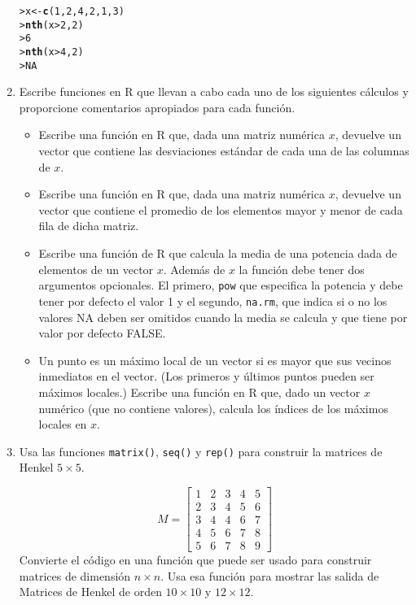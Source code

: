 \documentclass{article}\usepackage[]{graphicx}\usepackage[]{color}
\makeatletter
\newcommand{\hlnum}[1]{\textcolor[rgb]{0.686,0.059,0.569}{#1}}%
\newcommand{\hlopt}[1]{\textcolor[rgb]{0,0,0}{#1}}%
\newcommand{\hlstd}[1]{\textcolor[rgb]{0.345,0.345,0.345}{#1}}%
\newcommand{\hlkwb}[1]{\textcolor[rgb]{0.69,0.353,0.396}{#1}}%
\newcommand{\hlkwd}[1]{\textcolor[rgb]{0.737,0.353,0.396}{\textbf{#1}}}%
\newenvironment{kframe}{%
 \def\at@end@of@kframe{}%
 \ifinner\ifhmode%
  \def\at@end@of@kframe{\end{minipage}}%
  \begin{minipage}{\columnwidth}%
 \fi\fi%
 \def\FrameCommand##1{\hskip\@totalleftmargin \hskip-\fboxsep
 \colorbox{shadecolor}{##1}\hskip-\fboxsep
     \hskip-\linewidth \hskip-\@totalleftmargin \hskip\columnwidth}%
 \MakeFramed {\advance\hsize-\width
   \@totalleftmargin\z@ \linewidth\hsize
   \@setminipage}}%
 {\par\unskip\endMakeFramed%
 \at@end@of@kframe}
\newenvironment{knitrout}{}{} %
\makeatother
\begin{document}
\begin{enumerate}
\begin{knitrout}
\color{fgcolor}\begin{kframe}
\begin{alltt}
\hlstd{> }\hlstd{x}\hlkwb{<-}\hlkwd{c}\hlstd{(}\hlnum{1}\hlstd{,}\hlnum{2}\hlstd{,}\hlnum{4}\hlstd{,}\hlnum{2}\hlstd{,}\hlnum{1}\hlstd{,}\hlnum{3}\hlstd{)}
\hlstd{> }\hlkwd{nth}\hlstd{(x} \hlopt{>}\hlnum{2}\hlstd{,} \hlnum{2}\hlstd{)}
\hlstd{> }\hlnum{6}
\hlstd{> }\hlkwd{nth}\hlstd{(x} \hlopt{>} \hlnum{4}\hlstd{,}\hlnum{2}\hlstd{)}
\hlstd{> }\hlnum{NA}
\end{alltt}
\end{kframe}
\end{knitrout}
\item Escribe funciones en R que llevan a cabo cada uno de los siguientes c\'alculos y proporcione \mbox{comentarios} apropiados para cada funci\'on.
\begin{itemize}
\item Escribe una funci\'on en R que, dada una matriz num\'erica $x$, devuelve un vector que contiene las desviaciones est\'andar de cada una de las columnas de $x$.
\item Escribe una función en R que, dada una matriz num\'erica $x$, devuelve un vector que contiene el promedio de los elementos  mayor y menor de cada fila de dicha matriz.
\item Escribe una funci\'on de R que calcula la media de una potencia dada de  elementos de un vector $x$. Adem\'as de $x$ la funci\'on  debe tener dos argumentos opcionales. El primero, \texttt{pow} que especifica la potencia y debe tener por defecto el valor 1 y el segundo, \texttt{na.rm}, que indica si o no los valores NA  deben ser omitidos cuando la media se calcula y que tiene por valor por defecto FALSE.
\item Un punto es un m\'aximo local de un vector si es mayor que sus vecinos inmediatos en el vector. (Los primeros y \'ultimos puntos pueden ser m\'aximos locales.) Escribe una funci\'on en  R que, dado un vector $x$ num\'erico (que no contiene valores), calcula los \'indices de los m\'aximos locales en $x$.
\end{itemize}
\item Usa las funciones \texttt{matrix()}, \texttt{seq()} y \texttt{rep()} para construir la matrices de Henkel $5 \times 5$.

\[
M = \begin{bmatrix}
        1 & 2 & 3  & 4 & 5         \\[0.3em]
        2 & 3 & 4 & 5 & 6           \\[0.3em]
        3 & 4 & 4 & 6 & 7           \\[0.3em]
       4 & 5 & 6 & 7 & 8           \\[0.3em]
        5 & 6 & 7 & 8 & 9           
     \end{bmatrix}
     \]
Convierte el c\'odigo en una funci\'on  que puede ser usado para construir matrices de dimensi\'on $n \times n$. Usa esa funci\'on para mostrar las salida de Matrices de Henkel de orden $10 \times 10$ y $12 \times 12$.


\end{enumerate}
\end{document}
